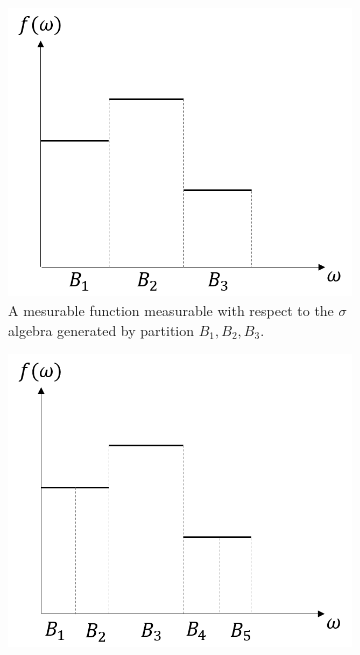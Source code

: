 \begin{refsection}
\begin{figure}[H]
	\centering
	\begin{subfigure}[b]{0.4\textwidth}
		\includegraphics[width=\textwidth]{figures/mathFundamentals/measurableFunctionDemo1}
		\caption{A mesurable function measurable with respect to the $\sigma$ algebra generated by partition $B_1,B_2,B_3$.}
	\end{subfigure}\quad
	\begin{subfigure}[b]{0.4\textwidth}
		\includegraphics[width=\textwidth]{figures/mathFundamentals/measurableFunctionDemo2}

\end{subfigure}
\end{figure}
\end{refsection}
